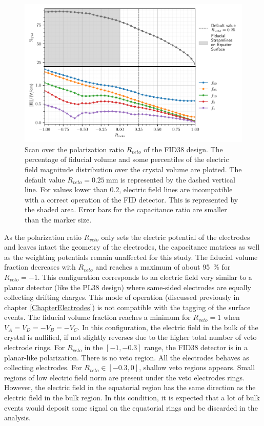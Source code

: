 \begin{figure}
\centering
\includegraphics[scale=1]{Figures/ElectrodesScan/capacitance_fiducial_veto_ratio.pdf}
\caption{Scan over the polarization ratio $R_{veto}$ of the FID38 design. The percentage of fiducial volume and some percentiles of the electric field magnitude distribution over the crystal volume are plotted. The default value $R_{veto}=\SI{0.25}{\mm}$ is represented by the dashed vertical line. For values lower than $0.2$, electric field lines are incompatible with a correct operation of the FID detector. This is represented by the shaded area. Error bars for the capacitance ratio are smaller than the marker size.}
\label{fig:capacitance-fiducial-veto-ratio}
\end{figure}

As the polarization ratio $R_{veto}$ only sets the electric potential of the electrodes and leaves intact the geometry of the electrodes, the capacitance matrices as well as the weighting potentials remain unaffected for this study.
The fiducial volume fraction decreases with $R_{veto}$ and reaches a maximum of about \SI{95}{\percent} for $R_{veto}=-1$. This configuration corresponds to an electric field very similar to a planar detector (like the PL38 design) where same-sided electrodes are equally collecting drifting charges. This mode of operation (discussed previously in chapter \ref{ChapterElectrodes}) is not compatible with the tagging of the surface events.
The fiducial volume fraction reaches a minimum for $R_{veto}=1$ when $V_A = V_D = -V_B = -V_C$. In this configuration, the electric field in the bulk of the crystal is nullified, if not slightly reverses due to the higher total number of veto electrode rings.
For $R_{veto}$ in the $[-1, -0.3]$ range, the FID38 detector is in a planar-like polarization. There is no veto region. All the electrodes behaves as collecting electrodes.
For $R_{veto} \in [-0.3, 0]$, shallow veto regions appears. Small regions of low electric field norm are present under the veto electrodes rings. However, the electric field in the equatorial region has the same direction as the electric field in the bulk region. In this condition, it is expected that a lot of bulk events would deposit some signal on the equatorial rings and be discarded in the analysis.

